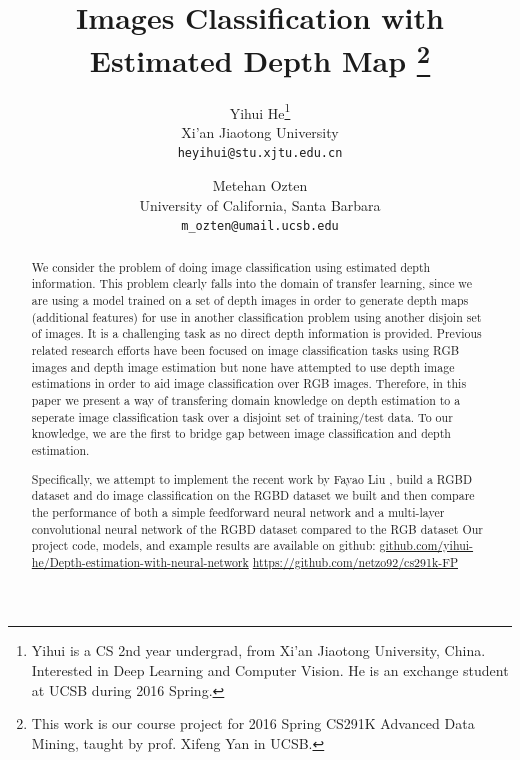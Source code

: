 \documentclass[10pt,twocolumn,letterpaper]{article}
\begin{document}
\title{Images Classification with Estimated Depth Map
\thanks{This work is our course project for 2016 Spring CS291K Advanced Data Mining, taught by prof. Xifeng Yan in UCSB.}}
\author{Yihui He\thanks{Yihui is a CS 2nd year undergrad, 
from Xi'an Jiaotong University, China. 
Interested in Deep Learning and Computer Vision. 
He is an exchange student at UCSB during 2016 Spring.}\\
Xi'an Jiaotong University\\
{\tt\small heyihui@stu.xjtu.edu.cn}
\and
Metehan Ozten\\
University of California, Santa Barbara\\
{\tt\small m\_ozten@umail.ucsb.edu}
}


\maketitle

\begin{abstract}
We consider the problem of doing image classification using estimated depth 
information. This problem clearly falls into the domain of transfer learning, since we are using a model trained on a set of depth images in order to generate depth maps (additional features) for use in another classification problem using another disjoin set of images. It is a challenging task as no direct depth information is 
provided. Previous related research efforts have been focused on image classification tasks using
RGB images and depth image estimation but none have attempted to use depth image estimations in order to aid image classification over RGB images. Therefore, in this paper we present a way of 
transfering domain knowledge on depth estimation to a seperate image classification task over a disjoint set of training/test data. 
To our knowledge, we are the first to bridge gap between image classification 
and depth estimation.

Specifically, we attempt to implement the recent work by Fayao 
Liu \etal\cite{liu2015deep}, build a RGBD dataset and do image classification 
on the RGBD dataset we built and then compare the performance of both a simple feedforward neural network and a multi-layer convolutional neural network of the RGBD dataset compared to the RGB dataset 
Our project code, models, and example results are available on github: \href{
https://github.com/yihui-he/Depth-estimation-with-neural-network 
}{github.com/yihui-he/Depth-estimation-with-neural-network}
\href{
https://github.com/netzo92/cs291k-FP
}{https://github.com/netzo92/cs291k-FP}
\end{abstract}
\end{document}
